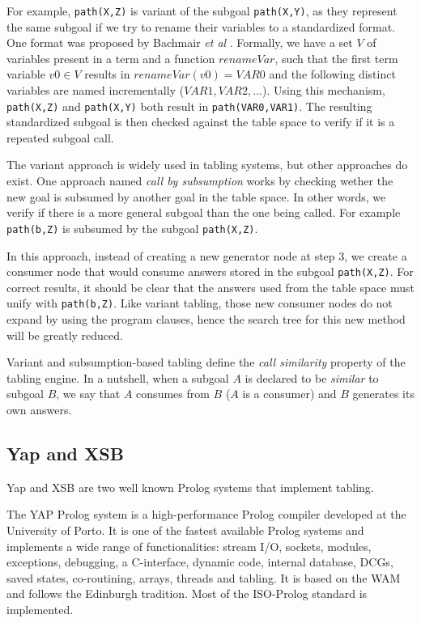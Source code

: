 For example, \texttt{path(X,Z)} is variant of the subgoal \texttt{path(X,Y)}, as they represent the same subgoal if we try
to rename their variables to a standardized format. One format was proposed by Bachmair \textit{et al} \cite{Bachmair-93}. Formally,
we have a set $V$ of variables present in a term and a function $renameVar$, such that the first term variable $v0 \in V$
results in $renameVar(v0) = VAR0$ and the following distinct variables are named incrementally ($VAR1, VAR2, ...$).
Using this mechanism, \texttt{path(X,Z)} and \texttt{path(X,Y)} both result in \texttt{path(VAR0,VAR1)}. The resulting
standardized subgoal is then checked against the table space to verify if it is a repeated subgoal call.

The variant approach is widely used in tabling systems, but other approaches do exist. One approach named
\textit{call by subsumption} works by checking wether the new goal is subsumed by another goal in the table space.
In other words, we verify if there is a more general subgoal than the one being called. For example
\texttt{path(b,Z)} is subsumed by the subgoal \texttt{path(X,Z)}.

In this approach, instead of creating a new generator node at step 3, we create a consumer node that would consume
answers stored in the subgoal \texttt{path(X,Z)}. For correct results, it should be clear that the answers used
from the table space must unify with \texttt{path(b,Z)}. Like variant tabling, those new consumer nodes do not expand
by using the program clauses, hence the search tree for this new method will be greatly reduced.

Variant and subsumption-based tabling define the \emph{call similarity} property of the tabling engine. In
a nutshell, when a subgoal $A$ is declared to be \emph{similar} to subgoal $B$, we say that $A$ consumes from
$B$ ($A$ is a consumer) and $B$ generates its own answers.

  \subsection{Yap and XSB}
  
  Yap \cite{system-yap} and XSB \cite{system-xsb} are two well known Prolog systems that implement tabling.
  
  The YAP Prolog system is a high-performance Prolog compiler developed at the University of Porto.
  It is one of the fastest available Prolog systems and implements a wide range of functionalities: 
  stream I/O, sockets, modules, exceptions, debugging, a C-interface, dynamic code, internal database,
  DCGs, saved states, co-routining, arrays, threads and tabling.
  It is based on the WAM and follows the Edinburgh tradition. Most of the ISO-Prolog standard is implemented.
  
